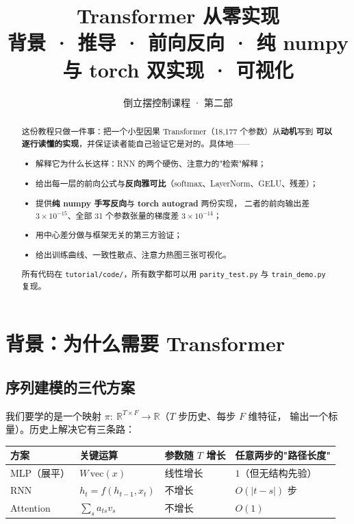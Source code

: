 \documentclass[11pt,a4paper]{ctexart}
\title{\textbf{Transformer 从零实现}\\[4pt]
\large 背景 · 推导 · 前向反向 · 纯 numpy 与 torch 双实现 · 可视化}
\author{倒立摆控制课程 · 第二部}
\date{}
\begin{document}
\maketitle

\begin{abstract}
\noindent
这份教程只做一件事：把一个小型因果 Transformer（18,177 个参数）从\textbf{动机}写到
\textbf{可以逐行读懂的实现}，并保证读者能自己验证它是对的。具体地——

\begin{itemize}[leftmargin=1.4em,itemsep=2pt]
  \item 解释它为什么长这样：RNN 的两个硬伤、注意力的"检索"解释；
  \item 给出每一层的前向公式与\textbf{反向雅可比}（softmax、LayerNorm、GELU、残差）；
  \item 提供\textbf{纯 numpy 手写反向}与 \textbf{torch autograd} 两份实现，
        二者的前向输出差 $3\times10^{-15}$、全部 31 个参数张量的梯度差 $3\times10^{-14}$；
  \item 用中心差分做与框架无关的第三方验证；
  \item 给出训练曲线、一致性散点、注意力热图三张可视化。
\end{itemize}

\noindent
所有代码在 \texttt{tutorial/code/}，所有数字都可以用 \texttt{parity\_test.py} 与
\texttt{train\_demo.py} 复现。
\end{abstract}

\tableofcontents
\newpage

\section{背景：为什么需要 Transformer}

\subsection{序列建模的三代方案}

我们要学的是一个映射 $\pi:\ \mathbb{R}^{T\times F}\to\mathbb{R}$（$T$ 步历史、每步 $F$ 维特征，
输出一个标量）。历史上解决它有三条路：

\begin{center}
\small
\begin{tabular}{@{}llll@{}}
\toprule
方案 & 关键运算 & 参数随 $T$ 增长 & 任意两步的"路径长度" \\
\midrule
MLP（展平） & $W\,\mathrm{vec}(x)$ & 线性增长 & $1$（但无结构先验）\\
RNN & $h_t=f(h_{t-1},x_t)$ & 不增长 & $O(|t-s|)$ 步 \\
Attention & $\sum_s a_{ts}v_s$ & 不增长 & $O(1)$ \\
\bottomrule
\end{tabular}
\end{center}
\end{document}
